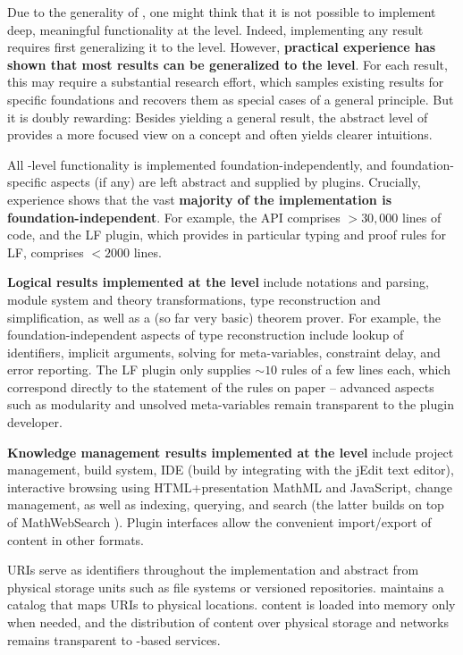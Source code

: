 Due to the generality of \mmt, one might think that it is not possible to implement deep, meaningful functionality at the \mmt level.
Indeed, implementing any result requires first generalizing it to the \mmt level.
However, \textbf{practical experience has shown that most results can be generalized to the \mmt level}.
For each result, this may require a substantial research effort, which samples existing results for specific foundations and recovers them as special cases of a general principle.
But it is doubly rewarding: Besides yielding a general result, the abstract level of \mmt provides a more focused view on a concept and often yields clearer intuitions.

All \mmt-level functionality is implemented foundation-independently, and foundation-specific aspects (if any) are left abstract and supplied by plugins.
Crucially, experience shows that the vast \textbf{majority of the implementation is foundation-independent}.
For example, the \mmt API comprises $>30,000$ lines of code, and the LF plugin, which provides in particular typing and proof rules for LF, comprises $<2000$ lines.
\medskip

\textbf{Logical results implemented at the \mmt level} include notations and parsing, module system and theory transformations, type reconstruction and simplification, as well as a (so far very basic) theorem prover.
For example, the foundation-independent aspects of type reconstruction include lookup of identifiers, implicit arguments, solving for meta-variables, constraint delay, and error reporting.
The LF plugin only supplies $\sim 10$ rules of a few lines each, which correspond directly to the statement of the rules on paper -- advanced aspects such as modularity and unsolved meta-variables remain transparent to the plugin developer.
\medskip

\textbf{Knowledge management results implemented at the \mmt level} include project management, build system, IDE (build by integrating \mmt with the jEdit text editor), interactive browsing using HTML+presentation MathML \cite{mathml} and JavaScript, change management, as well as indexing, querying, and search (the latter builds on top of MathWebSearch \cite{mathwebsearch}).
Plugin interfaces allow the convenient import/export of content in other formats.

\mmt URIs serve as identifiers throughout the implementation and abstract from physical storage units such as file systems or versioned repositories.
\mmt maintains a catalog that maps URIs to physical locations.
\mmt content is loaded into memory only when needed, and the distribution of content over physical storage and networks remains transparent to \mmt-based services.

